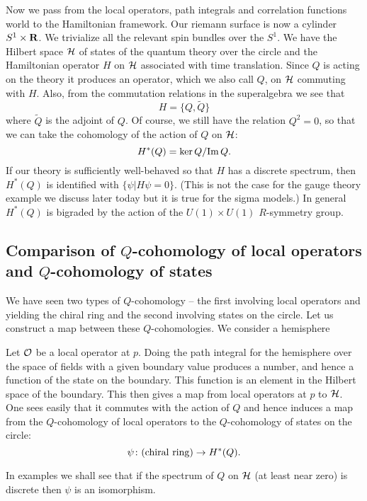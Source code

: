 Now we pass from the local operators, path integrals and correlation
functions world to the Hamiltonian framework.
Our riemann surface is now a cylinder $S^1\times {\bf R}$. We
trivialize all the relevant spin bundles over the $S^1$. We have the
Hilbert space ${\cal H}$ of states of the quantum theory over the
circle and the Hamiltonian operator $H$ on ${\cal H}$ associated with
time translation. Since $Q$ is acting on the theory it produces an
operator, which we also call $Q$, on ${\cal H}$ commuting with
$H$. Also, from the commutation 
relations in the superalgebra we see that
$$H=\{Q,\tilde Q\}$$
where $\tilde Q$ is the adjoint of $Q$. Of course, we still have the
relation $Q^2=0$, so that we can 
take the cohomology of the action of $Q$ on ${\cal H}$:
$$H^*(Q)={\rm ker}\,Q/{\rm Im}\,Q.$$
If our theory is sufficiently well-behaved so that $H$ has a discrete
spectrum, then $H^*(Q)$ is identified with $\{\psi|H\psi=0\}$.
(This is not the case for the gauge theory example we discuss later
today but it is true for the sigma models.)
In general $H^*(Q)$ is bigraded by the action of the $U(1)\times U(1)$
$R$-symmetry group.

\subsection{Comparison of $Q$-cohomology of local operators and
$Q$-cohomology of states} 

We have seen two types of $Q$-cohomology -- the first involving local
operators and yielding the chiral ring and the second involving states
on the circle. 
Let us construct a map between these $Q$-cohomologies. 
We consider a hemisphere

\centerline{\quad}
\centerline{\epsfxsize=1.5in}
\centerline{\quad}


Let ${\cal O}$ be a local operator at $p$. Doing the path
integral for the hemisphere over the space of fields with a given
boundary value produces a number, and hence a
function  of the  state on the boundary. This 
function is an element  in the Hilbert space of
the boundary.  This then gives a map  from  local
operators at $p$ to ${\cal H}$. One sees easily that it commutes with
the action of $Q$ and hence induces a map from the $Q$-cohomology of
local operators to the $Q$-cohomology of states on the circle:
$$\psi\colon ({\rm chiral\ ring})\to H^*(Q).$$

In examples we shall see that if the spectrum of $Q$ on ${\cal H}$ (at
least near zero) is discrete then $\psi$ is an isomorphism.

